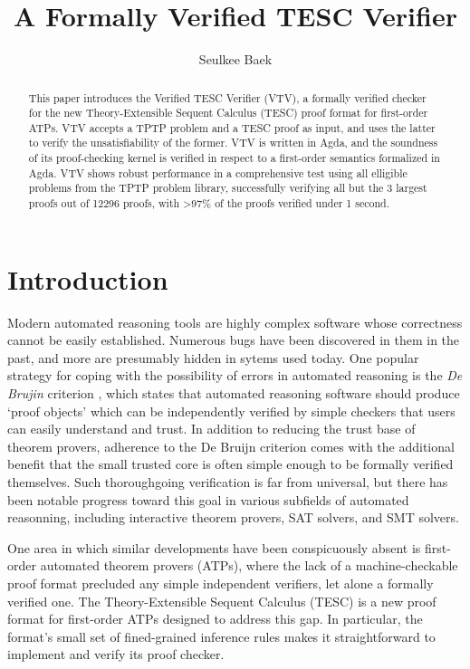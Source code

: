 \documentclass[12pt]{article}
\title{A Formally Verified TESC Verifier}
\author{Seulkee Baek}
\begin{document}
\maketitle

\begin{abstract}

This paper introduces the Verified TESC Verifier (VTV), a formally verified 
checker for the new Theory-Extensible Sequent Calculus (TESC) proof format for first-order ATPs. VTV accepts a
TPTP problem and a TESC proof as input, and uses the latter to verify the 
unsatisfiability of the former. VTV is written in Agda, and the soundness 
of its proof-checking kernel is verified in respect to a first-order
semantics formalized in Agda. VTV shows robust performance in a comprehensive 
test using all elligible problems from the TPTP problem library, 
successfully verifying all but the 3 largest proofs out of 12296 proofs,
with >97\% of the proofs verified under 1 second. 




\end{abstract}


\section{Introduction}

Modern automated reasoning tools are highly complex software whose correctness 
cannot be easily established. Numerous bugs have been discovered in them
in the past, and more are presumably hidden in sytems used today. One popular 
strategy for coping with the possibility of errors in automated reasoning is the 
\textit{De Brujin} criterion \cite{barendregt2005challenge}, which states that 
automated reasoning software should produce `proof objects' which can be 
independently verified by simple checkers that users can easily understand 
and trust. In addition to reducing the trust base of theorem provers, 
adherence to the De Bruijn criterion comes with the additional benefit that the 
small trusted core is often simple enough to be formally verified themselves. 
Such thoroughgoing verification is far from universal, but there has been notable 
progress toward this goal in various subfields of automated reasonning, 
including interactive theorem provers, SAT solvers, and SMT solvers.

One area in which similar developments have been conspicuously absent is 
first-order automated theorem provers (ATPs), where the lack of a machine-checkable
proof format precluded any simple independent verifiers, let alone a
formally verified one. The Theory-Extensible Sequent Calculus (TESC) is a new 
proof format for first-order ATPs designed to address this gap. In particular,
the format's small set of fined-grained inference rules makes it 
straightforward to implement and verify its proof checker.
\end{document}
